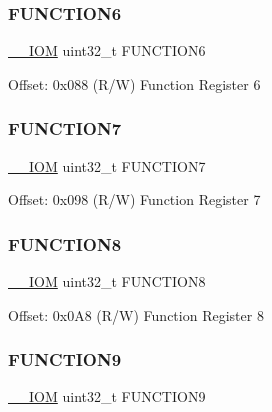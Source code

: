 \subsubsection{\texorpdfstring{F\+U\+N\+C\+T\+I\+O\+N6}{FUNCTION6}}
{\footnotesize\ttfamily \mbox{\hyperlink{core__cm4_8h_ab6caba5853a60a17e8e04499b52bf691}{\+\_\+\+\_\+\+I\+OM}} uint32\+\_\+t F\+U\+N\+C\+T\+I\+O\+N6}

Offset\+: 0x088 (R/W) Function Register 6 \mbox{\label{struct_d_w_t___type_a16e2f314ca3e2bf3383b81ec9a03a436}} 
\subsubsection{\texorpdfstring{F\+U\+N\+C\+T\+I\+O\+N7}{FUNCTION7}}
{\footnotesize\ttfamily \mbox{\hyperlink{core__cm4_8h_ab6caba5853a60a17e8e04499b52bf691}{\+\_\+\+\_\+\+I\+OM}} uint32\+\_\+t F\+U\+N\+C\+T\+I\+O\+N7}

Offset\+: 0x098 (R/W) Function Register 7 \mbox{\label{struct_d_w_t___type_abe84d144b85c8dae18f7dc6d290a04ea}} 
\subsubsection{\texorpdfstring{F\+U\+N\+C\+T\+I\+O\+N8}{FUNCTION8}}
{\footnotesize\ttfamily \mbox{\hyperlink{core__cm4_8h_ab6caba5853a60a17e8e04499b52bf691}{\+\_\+\+\_\+\+I\+OM}} uint32\+\_\+t F\+U\+N\+C\+T\+I\+O\+N8}

Offset\+: 0x0\+A8 (R/W) Function Register 8 \mbox{\label{struct_d_w_t___type_a70ada7a7062083e68edb96698f25ba6e}} 
\subsubsection{\texorpdfstring{F\+U\+N\+C\+T\+I\+O\+N9}{FUNCTION9}}
{\footnotesize\ttfamily \mbox{\hyperlink{core__cm4_8h_ab6caba5853a60a17e8e04499b52bf691}{\+\_\+\+\_\+\+I\+OM}} uint32\+\_\+t F\+U\+N\+C\+T\+I\+O\+N9}

